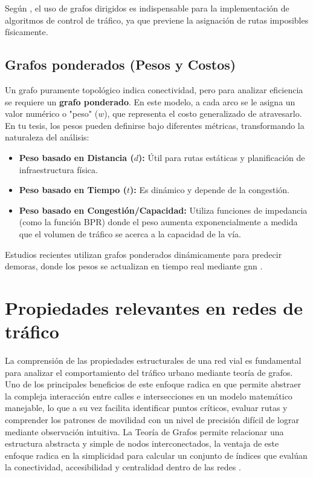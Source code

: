 Según \cite{reddy_efficient_nodate}, el uso de grafos dirigidos es indispensable para la implementación de algoritmos de control de tráfico, ya que previene la asignación de rutas imposibles 
físicamente.

\subsection{Grafos ponderados (Pesos y Costos)}
Un grafo puramente topológico indica conectividad, pero para analizar eficiencia se requiere un \textbf{grafo ponderado}. En este modelo, a cada arco se le asigna un valor numérico 
o "peso" ($w$), que representa el costo generalizado de atravesarlo.
En tu tesis, los pesos pueden definirse bajo diferentes métricas, transformando la naturaleza del análisis:

\begin{itemize}
    \item \textbf{Peso basado en Distancia ($d$):} Útil para rutas estáticas y planificación de infraestructura física.
    \item \textbf{Peso basado en Tiempo ($t$):} Es dinámico y depende de la congestión.
    \item \textbf{Peso basado en Congestión/Capacidad:} Utiliza funciones de impedancia (como la función BPR) donde el peso aumenta exponencialmente a medida que el volumen de 
    tráfico se acerca a la capacidad de la vía.
\end{itemize}

Estudios recientes utilizan grafos ponderados dinámicamente para predecir demoras, donde los pesos se actualizan en tiempo real 
mediante \acrfull{gnn} \cite{borg_graph_2024}.

\section{Propiedades relevantes en redes de tráfico}
La comprensión de las propiedades estructurales de una red vial es fundamental para analizar el comportamiento del tráfico urbano mediante teoría de grafos. Uno de los 
principales beneficios de este enfoque radica en que permite abstraer la compleja interacción entre calles e intersecciones en un modelo matemático manejable, lo que a su vez 
facilita identificar puntos críticos, evaluar rutas y comprender los patrones de movilidad con un nivel de precisión difícil de lograr mediante observación intuitiva. La Teoría 
de Grafos permite relacionar una estructura abstracta y simple de nodos interconectados, la ventaja de este enfoque radica en la simplicidad para calcular un conjunto de 
índices que evalúan la conectividad, accesibilidad y centralidad dentro de las redes \cite{arias_alisis_2016}.

